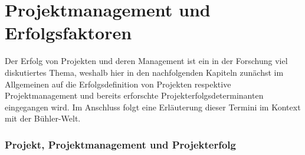 \chapter{Projektmanagement und Erfolgsfaktoren}\label{sec:pmerf}
	
Der Erfolg von Projekten und deren Management ist ein in der Forschung viel diskutiertes Thema, weshalb hier in den nachfolgenden Kapiteln zunächst im Allgemeinen auf die Erfolgsdefinition von Projekten respektive Projektmanagement und bereits erforschte Projekterfolgsdeterminanten eingegangen wird. Im Anschluss folgt eine Erläuterung dieser Termini im Kontext mit der Bühler-Welt.
	
\subsection{Projekt, Projektmanagement und Projekterfolg} \label{sec:proj}
	
